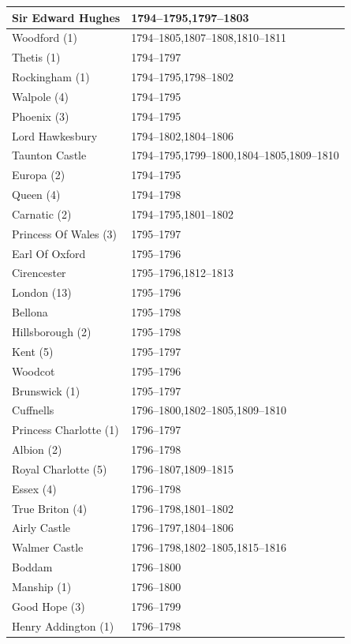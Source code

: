 \documentclass[CP]{copernicus}
\begin{document}
\begin{table}[!hbp]
\begin{minipage}[b]{0.5\linewidth}
{\begin{tabular}{|p{3.5cm}|p{3.5cm}|}
\hline
Sir Edward Hughes & 1794--1795,1797--1803\\
\hline
Woodford (1) & 1794--1805,1807--1808,1810--1811\\
\hline
Thetis (1) & 1794--1797\\
\hline
Rockingham (1) & 1794--1795,1798--1802\\
\hline
Walpole (4) & 1794--1795\\
\hline
Phoenix (3) & 1794--1795\\
\hline
Lord Hawkesbury & 1794--1802,1804--1806\\
\hline
Taunton Castle & 1794--1795,1799--1800,1804--1805,1809--1810\\
\hline
Europa (2) & 1794--1795\\
\hline
Queen (4) & 1794--1798\\
\hline
Carnatic (2) & 1794--1795,1801--1802\\
\hline
Princess Of Wales (3) & 1795--1797\\
\hline
Earl Of Oxford & 1795--1796\\
\hline
Cirencester & 1795--1796,1812--1813\\
\hline
London (13) & 1795--1796\\
\hline
Bellona & 1795--1798\\
\hline
Hillsborough (2) & 1795--1798\\
\hline
Kent (5) & 1795--1797\\
\hline
Woodcot & 1795--1796\\
\hline
Brunswick (1) & 1795--1797\\
\hline
Cuffnells & 1796--1800,1802--1805,1809--1810\\
\hline
Princess Charlotte (1) & 1796--1797\\
\hline
Albion (2) & 1796--1798\\
\hline
Royal Charlotte (5) & 1796--1807,1809--1815\\
\hline
Essex (4) & 1796--1798\\
\hline
True Briton (4) & 1796--1798,1801--1802\\
\hline
Airly Castle & 1796--1797,1804--1806\\
\hline
Walmer Castle & 1796--1798,1802--1805,1815--1816\\
\hline
Boddam & 1796--1800\\
\hline
Manship (1) & 1796--1800\\
\hline
Good Hope (3) & 1796--1799\\
\hline
Henry Addington (1) & 1796--1798\\

\end{tabular}}
\end{minipage}
\end{table}
\end{document}
